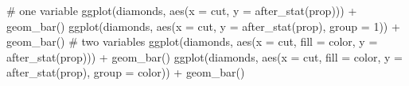 \documentclass[
  letterpaper,
  DIV=11,
  numbers=noendperiod]{scrreprt}
\newenvironment{Shaded}{\begin{snugshade}}{\end{snugshade}}
\newcommand{\AttributeTok}[1]{\textcolor[rgb]{0.40,0.45,0.13}{#1}}
\newcommand{\CommentTok}[1]{\textcolor[rgb]{0.37,0.37,0.37}{#1}}
\newcommand{\DecValTok}[1]{\textcolor[rgb]{0.68,0.00,0.00}{#1}}
\newcommand{\FunctionTok}[1]{\textcolor[rgb]{0.28,0.35,0.67}{#1}}
\newcommand{\NormalTok}[1]{\textcolor[rgb]{0.00,0.23,0.31}{#1}}
\newcommand{\SpecialCharTok}[1]{\textcolor[rgb]{0.37,0.37,0.37}{#1}}
\begin{document}
\begin{enumerate}
\begin{Shaded}
\begin{Highlighting}[]
\CommentTok{\# one variable}
\FunctionTok{ggplot}\NormalTok{(diamonds, }\FunctionTok{aes}\NormalTok{(}\AttributeTok{x =}\NormalTok{ cut, }
                     \AttributeTok{y =} \FunctionTok{after\_stat}\NormalTok{(prop))) }\SpecialCharTok{+} 
  \FunctionTok{geom\_bar}\NormalTok{()}
\FunctionTok{ggplot}\NormalTok{(diamonds, }\FunctionTok{aes}\NormalTok{(}\AttributeTok{x =}\NormalTok{ cut, }
                     \AttributeTok{y =} \FunctionTok{after\_stat}\NormalTok{(prop), }
                     \AttributeTok{group =} \DecValTok{1}\NormalTok{)) }\SpecialCharTok{+} 
  \FunctionTok{geom\_bar}\NormalTok{()}
\CommentTok{\# two variables}
\FunctionTok{ggplot}\NormalTok{(diamonds, }\FunctionTok{aes}\NormalTok{(}\AttributeTok{x =}\NormalTok{ cut, }
                     \AttributeTok{fill =}\NormalTok{ color, }
                     \AttributeTok{y =} \FunctionTok{after\_stat}\NormalTok{(prop))) }\SpecialCharTok{+} 
  \FunctionTok{geom\_bar}\NormalTok{()}
\FunctionTok{ggplot}\NormalTok{(diamonds, }\FunctionTok{aes}\NormalTok{(}\AttributeTok{x =}\NormalTok{ cut, }
                     \AttributeTok{fill =}\NormalTok{ color, }
                     \AttributeTok{y =} \FunctionTok{after\_stat}\NormalTok{(prop), }
                     \AttributeTok{group =}\NormalTok{ color)) }\SpecialCharTok{+} 
  \FunctionTok{geom\_bar}\NormalTok{()}
\end{Highlighting}
\end{Shaded}

  \begin{figure}

  \begin{minipage}[t]{0.50\linewidth}

  {\centering 


  }

  \end{minipage}%
  \begin{minipage}[t]{0.50\linewidth}

  {\centering 


}
\end{minipage}
\end{figure}
\end{enumerate}
\end{document}
